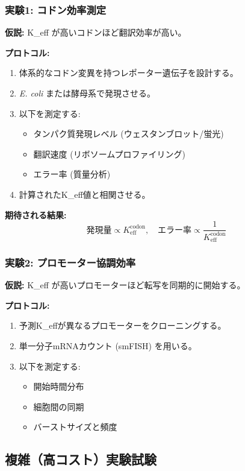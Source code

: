 \documentclass[12pt]{article}
\begin{document}
	\subsubsection{実験1: コドン効率測定}
	\textbf{仮説:} K\_eff が高いコドンほど翻訳効率が高い。
	
	\textbf{プロトコル:}
	\begin{enumerate}
		\item 体系的なコドン変異を持つレポーター遺伝子を設計する。
		\item \textit{E. coli} または酵母系で発現させる。
		\item 以下を測定する:
		\begin{itemize}
			\item タンパク質発現レベル (ウェスタンブロット/蛍光)
			\item 翻訳速度 (リボソームプロファイリング)
			\item エラー率 (質量分析)
		\end{itemize}
		\item 計算されたK\_eff値と相関させる。
	\end{enumerate}
	
	\textbf{期待される結果:}
	\[
	\text{発現量} \propto K_{\text{eff}}^{\text{codon}}, \quad \text{エラー率} \propto \frac{1}{K_{\text{eff}}^{\text{codon}}}
	\]
	
	\subsubsection{実験2: プロモーター協調効率}
	\textbf{仮説:} K\_eff が高いプロモーターほど転写を同期的に開始する。
	
	\textbf{プロトコル:}
	\begin{enumerate}
		\item 予測K\_effが異なるプロモーターをクローニングする。
		\item 単一分子mRNAカウント (smFISH) を用いる。
		\item 以下を測定する:
		\begin{itemize}
			\item 開始時間分布
			\item 細胞間の同期
			\item バーストサイズと頻度
		\end{itemize}
	\end{enumerate}
	
	\subsection{複雑（高コスト）実験試験}
	
\end{document}
